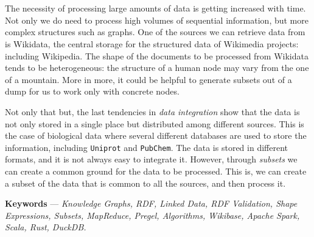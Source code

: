 \newenvironment{abstract}%
{\cleardoublepage\null\vfill\section*{\abstractname}}%
{\vfill\null}
\begin{abstract}
    The necessity of processing large amounts of data is getting increased with time. Not only we do need to process high volumes of sequential information, but more complex structures such as graphs. One of the sources we can retrieve data from is Wikidata, the central storage for the structured data of Wikimedia projects: including Wikipedia. The shape of the documents to be processed from Wikidata tends to be heterogeneous: the structure of a human node may vary from the one of a mountain. More in more, it could be helpful to generate subsets out of a dump for us to work only with concrete nodes.

    Not only that but, the last tendencies in \textit{data integration} show that the data is not only stored in a single place but distributed among different sources. This is the case of biological data where several different databases are used to store the information, including \texttt{Uniprot} and \texttt{PubChem}. The data is stored in different formats, and it is not always easy to integrate it. However, through \textit{subsets} we can create a common ground for the data to be processed. This is, we can create a subset of the data that is common to all the sources, and then process it.
\end{abstract}

\noindent \textbf{Keywords} --- \textit{Knowledge Graphs, RDF, Linked Data, RDF Validation, Shape Expressions, Subsets, MapReduce, Pregel, Algorithms, Wikibase, Apache Spark, Scala, Rust, DuckDB.}